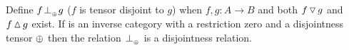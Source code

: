 %

\begin{lemma}\label{lem:tensor_disjointness_is_disjointness}
  Define $f {}_{{}_{}}{\perp_{{}_{\oplus}}} g$ ($f$ is tensor disjoint to $g$) when $f, g: A\to B$ and both $f\operatorname{\triangledown} g$ and
  $f\operatorname{\vartriangle} g$ exist.  If \X is an inverse category with a restriction zero and a disjointness tensor
  $\oplus$ then the relation ${}_{{}_{}}{\perp_{{}_{\oplus}}}$ is a disjointness relation.
\end{lemma}
